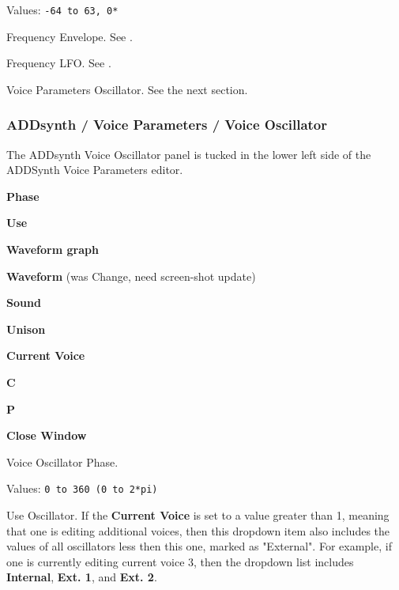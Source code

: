    Values: \texttt{-64 to 63, 0*}

   Frequency Envelope.
   See .

   Frequency LFO.
   See .

   Voice Parameters Oscillator.
   See the next section.

\subsubsection{ADDsynth / Voice Parameters / Voice Oscillator}
\label{subsubsec:addsynth_voice_parameters_oscillator}

   The ADDsynth Voice Oscillator panel is tucked in the lower left side of the
   ADDSynth Voice Parameters editor.

   \begin{enumber}
      \item \textbf{Phase}
      \item \textbf{Use}
      \item \textbf{Waveform graph}
      \item \textbf{Waveform} (was Change, need screen-shot update)
      \item \textbf{Sound}
      \item \textbf{Unison}
      \item \textbf{Current Voice}
      \item \textbf{C}
      \item \textbf{P}
      \item \textbf{Close Window}
   \end{enumber}

   \setcounter{ItemCounter}{0}      %

   Voice Oscillator Phase.

   Values: \texttt{0 to 360 (0 to 2*pi)}

   Use Oscillator.
   If the \textbf{Current Voice} is set to a value greater than 1, meaning
   that one is editing additional voices, then this dropdown item also
   includes the values of all oscillators less then this one, marked as
   "External".  For example, if one is currently editing current voice 3,
   then the dropdown list includes \textbf{Internal}, \textbf{Ext. 1}, and
   \textbf{Ext. 2}.

